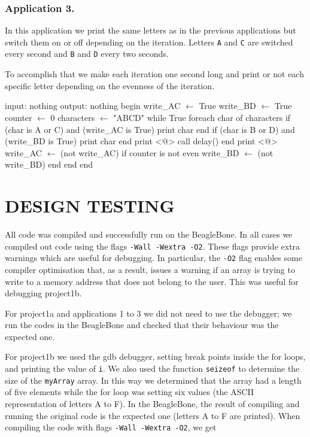\documentclass[letterpaper, 12pt]{article}
\begin{document}
\subsubsection{Application 3.}

In this application we print the same letters as in the previous applications but switch them on or off depending on the iteration. Letters \verb+A+ and \verb+C+ are switched every second and \verb+B+ and \verb+D+ every two seconds.

To accomplish that we make each iteration one second long and print or not each specific letter depending on the evenness of the iteration.

\begin{pseudocode}[caption={Application 2 pseudocode (implemented).}, label={app2}]
 input: nothing
 output: nothing
 begin
    write_AC $\gets$ True
    write_BD $\gets$ True
    counter $\gets$ 0
    characters $\gets$ "ABCD"
    while True
        foreach char of characters
            if (char is A or C) and (write_AC is True)
                print char
            end
            if (char is B or D) and (write_BD is True)
                print char
            end
            print <@\textvisiblespace@>
            call delay()
        end
        print <@\return@>
        write_AC $\gets$ (not write_AC)
        if counter is not even
            write_BD $\gets$ (not write_BD)
        end
    end
 end
\end{pseudocode}


\section{DESIGN TESTING}
\label{sec:design_testing}

All code was compiled and successfully run on the BeagleBone. In all cases we compiled out code using the flags \verb+-Wall -Wextra -O2+. These flags provide extra warnings which are useful for debugging. In particular, the \verb+-O2+ flag enables some compiler optimisation that, as a result, issues a warning if an array is trying to write to a memory address that does not belong to the user. This was useful for debugging project1b.

For project1a and applications 1 to 3 we did not need to use the debugger; we run the codes in the BeagleBone and checked that their behaviour was the expected one.

For project1b we used the gdb debugger, setting break points inside the for loops, and printing the value of \verb+i+. We also used the function \verb+seizeof+ to determine the size of the \verb+myArray+ array. In this way we determined that the array had a length of five elements while the for loop was setting six values (the ASCII representation of letters A to F). In the BeagleBone, the result of compiling and running the original code is the expected one (letters A to F are printed). When compiling the code with flags \verb+-Wall -Wextra -O2+, we get
\end{document}
